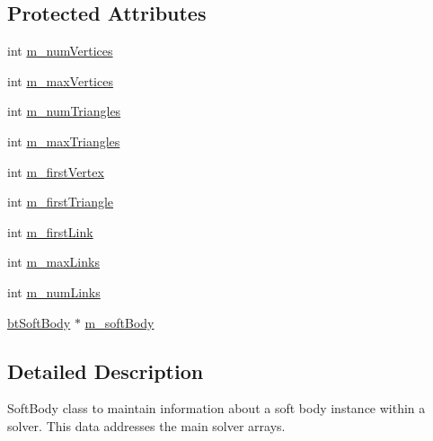 \subsection*{Protected Attributes}
\begin{DoxyCompactItemize}
\item 
int \hyperlink{classbt_d_x11_soft_body_solver_1_1bt_accelerated_soft_body_interface_a72b2382d4a25c7d3124b468963b60671}{m\+\_\+num\+Vertices}
\item 
int \hyperlink{classbt_d_x11_soft_body_solver_1_1bt_accelerated_soft_body_interface_a2420af1b2414a1d7acc7f22a0ff78dda}{m\+\_\+max\+Vertices}
\item 
int \hyperlink{classbt_d_x11_soft_body_solver_1_1bt_accelerated_soft_body_interface_a9342b3daf5a161a9a330b568ca443a91}{m\+\_\+num\+Triangles}
\item 
int \hyperlink{classbt_d_x11_soft_body_solver_1_1bt_accelerated_soft_body_interface_a27999dea8ef1b24191a85f51beb060f3}{m\+\_\+max\+Triangles}
\item 
int \hyperlink{classbt_d_x11_soft_body_solver_1_1bt_accelerated_soft_body_interface_addd5d6f7b4ed8ddf7c9382543d6d70ba}{m\+\_\+first\+Vertex}
\item 
int \hyperlink{classbt_d_x11_soft_body_solver_1_1bt_accelerated_soft_body_interface_a04ee8fba120b0bf0fd6db98064294938}{m\+\_\+first\+Triangle}
\item 
int \hyperlink{classbt_d_x11_soft_body_solver_1_1bt_accelerated_soft_body_interface_a811f39a00ed617732c5a39d946f13179}{m\+\_\+first\+Link}
\item 
int \hyperlink{classbt_d_x11_soft_body_solver_1_1bt_accelerated_soft_body_interface_a925199ca22b1b2e8ea23e1fc01d7e82e}{m\+\_\+max\+Links}
\item 
int \hyperlink{classbt_d_x11_soft_body_solver_1_1bt_accelerated_soft_body_interface_a6e0c7aeae94c8a6f786c3f5d319b3e67}{m\+\_\+num\+Links}
\item 
\hyperlink{classbt_soft_body}{bt\+Soft\+Body} $\ast$ \hyperlink{classbt_d_x11_soft_body_solver_1_1bt_accelerated_soft_body_interface_a27dde0294582c35f9ccab253d2f0dc5d}{m\+\_\+soft\+Body}
\end{DoxyCompactItemize}


\subsection{Detailed Description}
Soft\+Body class to maintain information about a soft body instance within a solver. This data addresses the main solver arrays. 

